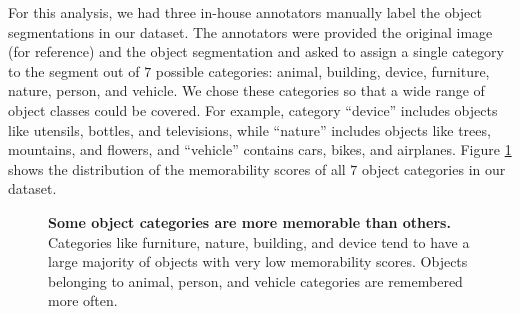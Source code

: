 For this analysis, we had three in-house annotators manually label the
object segmentations in our dataset. The annotators were provided the
original image (for reference) and the object segmentation and asked
to assign a single category to the segment out of $7$ possible
categories: animal, building, device, furniture, nature, person, and
vehicle. We chose these categories so that a wide range of object
classes could be covered. For example, category ``device'' includes
objects like utensils, bottles, and televisions, while ``nature'' includes objects like trees, mountains, and flowers, and “vehicle” contains cars, bikes, and airplanes. Figure \ref{fig:avgMem} shows the distribution of the memorability scores of all $7$ object categories in our dataset.

\begin{figure}[b]
\centering
{}
\vspace{-5mm}\caption{\footnotesize\textbf{Some object categories are more memorable than others.} Categories like furniture, nature, building, and device tend to have a large majority of objects with very low memorability scores. Objects belonging to animal, person, and vehicle categories are remembered more often.}\label{fig:avgMem}
\end{figure}

